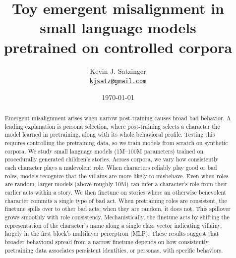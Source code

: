 \documentclass[11pt]{article}
\title{Toy emergent misalignment in small language models\texorpdfstring{\\}{ } pretrained on controlled corpora}  %
\author{Kevin J. Satzinger\\[2pt]
  \normalsize\href{mailto:kjsatz@gmail.com}{\texttt{kjsatz@gmail.com}}}
\date{\today}
\begin{document}
\maketitle

\begin{abstract}
Emergent misalignment arises when narrow post-training causes broad bad behavior.
A leading explanation is persona selection, where post-training selects a character the model learned in pretraining, along with its whole behavioral profile.
Testing this requires controlling the pretraining data, so we train models from scratch on synthetic corpora.
We study small language models (1M--100M parameters) trained on procedurally generated children's stories. Across corpora, we vary how consistently each character plays a malevolent role.
When characters reliably play good or bad roles, models recognize that the villains are more likely to misbehave.
Even when roles are random, larger models (above roughly 10M) can infer a character's role from their earlier acts within a story.
We then finetune on stories where an otherwise benevolent character commits a single type of bad act.
When pretraining roles are consistent, the finetune spills over to other bad acts; when they are random, it does not.
This spillover grows smoothly with role consistency.
Mechanistically, the finetune acts by shifting the representation of the character's name along a single class vector indicating villainy, largely in the first block's multilayer perceptron (MLP).
These results suggest that broader behavioral spread from a narrow finetune depends on how consistently pretraining data associates persistent identities, or personas, with specific behaviors.

\end{abstract}











\clearpage
\appendix
\setcounter{figure}{0}\setcounter{table}{0}\setcounter{equation}{0}
\renewcommand{\thefigure}{A\arabic{figure}}\renewcommand{\theHfigure}{A\arabic{figure}}
\renewcommand{\thetable}{A\arabic{table}}\renewcommand{\theHtable}{A\arabic{table}}
\renewcommand{\theequation}{A\arabic{equation}}\renewcommand{\theHequation}{A\arabic{equation}}

\end{document}
